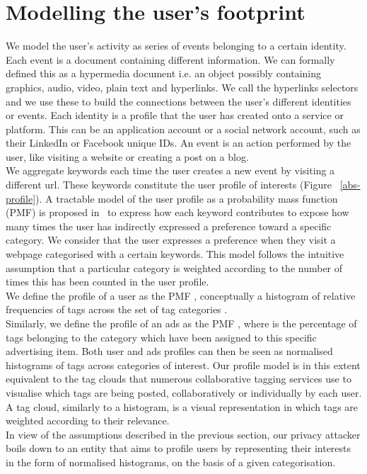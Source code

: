 \documentclass[runningheads,a4paper]{llncs}
\begin{document}
\section{Modelling the user's footprint}

We model the user's activity as series of events belonging to a certain identity. Each event is a document containing different information. We can formally defined this as a hypermedia document i.e. an object possibly containing graphics, audio, video, plain text and hyperlinks. We call the hyperlinks selectors and we use these to build the connections between the user's different identities or events. Each identity is a profile that the user has created onto a service or platform. This can be an application account or a social network account, such as their LinkedIn or Facebook unique IDs. An event is an action performed by the user, like visiting a website or creating a post on a blog.
\\
We aggregate keywords each time the user creates a new event by visiting a different url. These keywords constitute the user profile of interests (Figure ~\ref{abs-profile}). A tractable model of the user profile as a probability mass function (PMF) is proposed in~\cite{Parra12DKE,Parra12TKDE} to express how each keyword contributes to expose how many times the user has indirectly expressed a preference toward a specific category. We consider that the user expresses a preference when they visit a webpage categorised with a certain keywords. This model follows the intuitive assumption that a particular category is weighted according to the number of times this has been counted in the user  profile.
\\
We define the profile of a user  as the PMF , conceptually a histogram of relative frequencies of tags across the set of tag categories .
\\
Similarly, we define the profile of an ads  as the PMF , where  is the percentage of tags belonging to the category  which have been assigned to this specific advertising item. Both user and ads profiles can then be seen as normalised histograms of tags across categories of interest. Our profile model is in this extent equivalent to the tag clouds that numerous collaborative tagging services use to visualise which tags are being posted, collaboratively or individually by each user. A tag cloud, similarly to a histogram, is a visual representation in which tags are weighted according to their relevance.
\\
In view of the assumptions described in the previous section, our privacy attacker boils down to an entity that aims to profile users by representing their interests in the form of normalised histograms, on the basis of a given categorisation.
\end{document}
